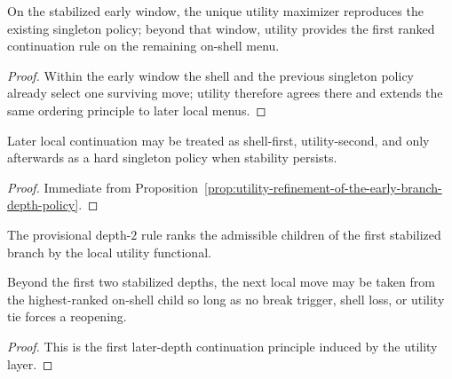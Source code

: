 \begin{proposition}
\label{prop:utility-refinement-of-the-early-branch-depth-policy}
On the stabilized early window, the unique utility maximizer reproduces the existing singleton policy; beyond that window, utility provides the first ranked continuation rule on the remaining on-shell menu.
\end{proposition}

\begin{proof}
Within the early window the shell and the previous singleton policy already select one surviving move; utility therefore agrees there and extends the same ordering principle to later local menus.
\end{proof}

\begin{corollary}
\label{cor:what-the-first-local-utility-layer-already-buys-for-later-depth-extension}
Later local continuation may be treated as shell-first, utility-second, and only afterwards as a hard singleton policy when stability persists.
\end{corollary}

\begin{proof}
Immediate from Proposition~\ref{prop:utility-refinement-of-the-early-branch-depth-policy}.
\end{proof}

\begin{definition}
\label{def:first-utility-guided-provisional-depth-2-continuation-rule}
The provisional depth-$2$ rule ranks the admissible children of the first stabilized branch by the local utility functional.
\end{definition}

\begin{proposition}
\label{prop:utility-supported-continuation-beyond-the-stabilized-early-depth-window}
Beyond the first two stabilized depths, the next local move may be taken from the highest-ranked on-shell child so long as no break trigger, shell loss, or utility tie forces a reopening.
\end{proposition}

\begin{proof}
This is the first later-depth continuation principle induced by the utility layer.
\end{proof}

